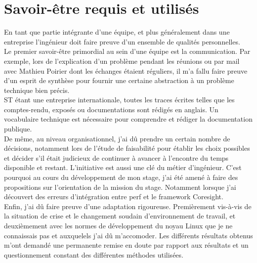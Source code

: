 
\section{Savoir-être requis et utilisés}

En tant que partie intégrante d'une équipe, et plus généralement dans une
entreprise l'ingénieur doit faire preuve d'un ensemble de qualités
personnelles. \\

Le premier savoir-être primordial au sein d'une équipe est la communication.
Par exemple, lors de l'explication d'un problème pendant les réunions ou par
mail avec Mathieu Poirier dont les échanges étaient réguliers, il m'a fallu
faire preuve d'un esprit de synthèse pour fournir une certaine abstraction à
un problème technique bien précis. \\

ST étant une entreprise internationale, toutes les traces écrites telles que
les comptes-rendu, exposés ou documentations sont rédigés en anglais. Un
vocabulaire technique est nécessaire pour comprendre et rédiger la
documentation publique. \\

De même, au niveau organisationnel, j'ai dû prendre un certain nombre de
décisions, notamment lors de l'étude de faisabilité pour établir les choix
possibles et décider s'il était judicieux de continuer à avancer à l'encontre
du temps disponible et restant. L'initiative est aussi une clé du métier
d'ingénieur. C'est pourquoi au cours du développement de mon stage, j'ai été
amené à faire des propositions sur l'orientation de la mission du stage.
Notamment lorsque j'ai découvert des erreurs d'intégration entre perf et
le framework Coresight. \\

Enfin, j'ai dû faire preuve d'une adaptation rigoureuse. Premièrement
vis-à-vis de la situation de crise et le changement soudain d'environnement de
travail, et deuxièmement avec les normes de développement du noyau Linux que
je ne connaissais pas et auxquelels j'ai dû m'accomoder. Les différents
résultats obtenus m'ont demandé une permanente remise en doute par rapport aux
résultats et un questionnement constant des différentes méthodes utilisées. \\
